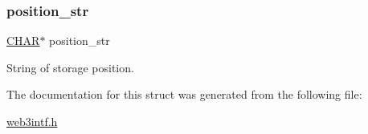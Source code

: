 \subsubsection{\texorpdfstring{position\+\_\+str}{position\_str}}
{\footnotesize\ttfamily \mbox{\hyperlink{boattypes_8h_aebb9e13210d88d43e32e735ada43a425}{C\+H\+AR}}$\ast$ position\+\_\+str}



String of storage position. 



The documentation for this struct was generated from the following file\+:\begin{DoxyCompactItemize}
\item 
\mbox{\hyperlink{web3intf_8h}{web3intf.\+h}}\end{DoxyCompactItemize}
